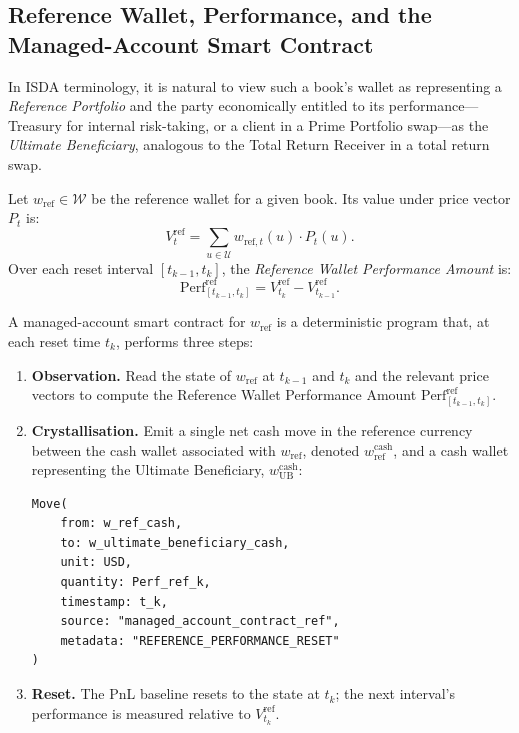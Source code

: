 \documentclass[11pt,a4paper]{article}
\begin{document}
\subsection{Reference Wallet, Performance, and the Managed-Account Smart Contract}

In ISDA terminology, it is natural to view such a book's wallet as representing a \textit{Reference Portfolio} and the party economically entitled to its performance---Treasury for internal risk-taking, or a client in a Prime Portfolio swap---as the \textit{Ultimate Beneficiary}, analogous to the Total Return Receiver in a total return swap.

Let $w_{\text{ref}} \in \mathcal{W}$ be the reference wallet for a given book. Its value under price vector $P_t$ is:
\[
V_t^{\text{ref}} = \sum_{u \in \mathcal{U}} w_{\text{ref},t}(u) \cdot P_t(u).
\]
Over each reset interval $[t_{k-1}, t_k]$, the \textit{Reference Wallet Performance Amount} is:
\[
\text{Perf}^{\text{ref}}_{[t_{k-1}, t_k]} = V^{\text{ref}}_{t_k} - V^{\text{ref}}_{t_{k-1}}.
\]

A managed-account smart contract for $w_{\text{ref}}$ is a deterministic program that, at each reset time $t_k$, performs three steps:

\begin{enumerate}
\item \textbf{Observation.} Read the state of $w_{\text{ref}}$ at $t_{k-1}$ and $t_k$ and the relevant price vectors to compute the Reference Wallet Performance Amount $\text{Perf}^{\text{ref}}_{[t_{k-1}, t_k]}$.

\item \textbf{Crystallisation.} Emit a single net cash move in the reference currency between the cash wallet associated with $w_{\text{ref}}$, denoted $w^{\text{cash}}_{\text{ref}}$, and a cash wallet representing the Ultimate Beneficiary, $w^{\text{cash}}_{\text{UB}}$:

\begin{lstlisting}
Move(
    from: w_ref_cash,
    to: w_ultimate_beneficiary_cash,
    unit: USD,
    quantity: Perf_ref_k,
    timestamp: t_k,
    source: "managed_account_contract_ref",
    metadata: "REFERENCE_PERFORMANCE_RESET"
)
\end{lstlisting}

\item \textbf{Reset.} The PnL baseline resets to the state at $t_k$; the next interval's performance is measured relative to $V^{\text{ref}}_{t_k}$.
\end{enumerate}
\end{document}
